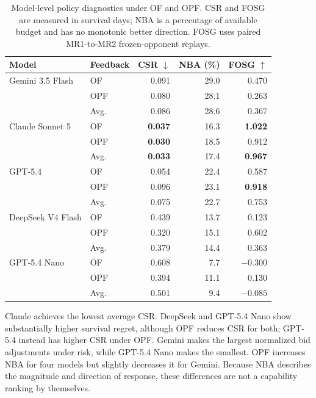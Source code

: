 \begin{table}[t]
    \centering
    \small
    \setlength{\tabcolsep}{3.2pt}
    \caption{Model-level policy diagnostics under OF and OPF. CSR and FOSG
    are measured in survival days; NBA is a percentage of available budget
    and has no monotonic better direction. FOSG uses paired MR1-to-MR2
    frozen-opponent replays.}
    \label{tab:capability-diagnostics}
    \begin{tabular}{llrrr}
        \toprule
        Model & Feedback & CSR $\downarrow$ & NBA (\%) & FOSG $\uparrow$ \\
        \midrule
        Gemini 3.5 Flash
            & OF  & 0.091 & 29.0 & 0.470 \\
            & OPF & 0.080 & 28.1 & 0.263 \\
            & Avg. & 0.086 & 28.6 & 0.367 \\
        \addlinespace
        Claude Sonnet 5
            & OF  & \textbf{0.037} & 16.3 & \textbf{1.022} \\
            & OPF & \textbf{0.030} & 18.5 & 0.912 \\
            & Avg. & \textbf{0.033} & 17.4 & \textbf{0.967} \\
        \addlinespace
        GPT-5.4
            & OF  & 0.054 & 22.4 & 0.587 \\
            & OPF & 0.096 & 23.1 & \textbf{0.918} \\
            & Avg. & 0.075 & 22.7 & 0.753 \\
        \addlinespace
        DeepSeek V4 Flash
            & OF  & 0.439 & 13.7 & 0.123 \\
            & OPF & 0.320 & 15.1 & 0.602 \\
            & Avg. & 0.379 & 14.4 & 0.363 \\
        \addlinespace
        GPT-5.4 Nano
            & OF  & 0.608 & 7.7 & $-0.300$ \\
            & OPF & 0.394 & 11.1 & 0.130 \\
            & Avg. & 0.501 & 9.4 & $-0.085$ \\
        \bottomrule
    \end{tabular}
\end{table}

Claude achieves the lowest average CSR. DeepSeek and GPT-5.4 Nano show
substantially higher survival regret, although OPF reduces CSR for both;
GPT-5.4 instead has higher CSR under OPF. Gemini makes the largest normalized
bid adjustments under risk, while GPT-5.4 Nano makes the smallest. OPF
increases NBA for four models but slightly decreases it for Gemini. Because
NBA describes the magnitude and direction of response, these differences are
not a capability ranking by themselves.


